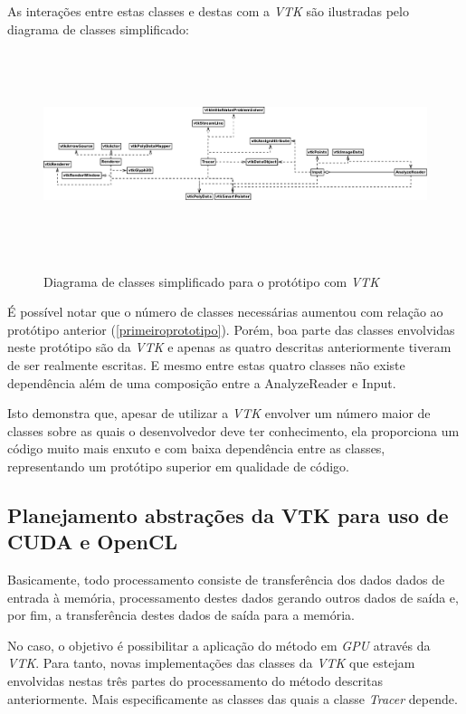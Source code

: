   As interações entre estas classes e destas com a \textit{VTK} são ilustradas pelo diagrama de classes simplificado:
  
  \begin{figure}[!h]
    \begin{center}
      \includegraphics[width=125mm, height=60mm]{images/diagramadeclassevtk.png}
      \label{fig:diagramadeclassevtk}
      \caption{Diagrama de classes simplificado para o protótipo com \textit{VTK}}
    \end{center}
  \end{figure}
  
  É possível notar que o número de classes necessárias aumentou com relação ao protótipo anterior (\ref{primeiroprototipo}). Porém, boa parte das classes envolvidas neste protótipo são da \textit{VTK} e apenas as quatro descritas anteriormente tiveram de ser realmente escritas. E mesmo entre estas quatro classes não existe dependência além de uma composição entre a AnalyzeReader e Input.
  
  Isto demonstra que, apesar de utilizar a \textit{VTK} envolver um número maior de classes sobre as quais o desenvolvedor deve ter conhecimento, ela proporciona um código muito mais enxuto e com baixa dependência entre as classes, representando um protótipo superior em qualidade de código.
  
  \subsection{Planejamento abstrações da VTK para uso de CUDA e OpenCL}
  Basicamente, todo processamento consiste de transferência dos dados dados de entrada à memória, processamento destes dados gerando outros dados de saída e, por fim, a transferência destes dados de saída para a memória.
  
  No caso, o objetivo é possibilitar a aplicação do método em \textit{GPU} através da \textit{VTK}. Para tanto, novas implementações das classes da \textit{VTK} que estejam envolvidas nestas três partes do processamento do método descritas anteriormente. Mais especificamente as classes das quais a classe \textit{Tracer} depende.
  
